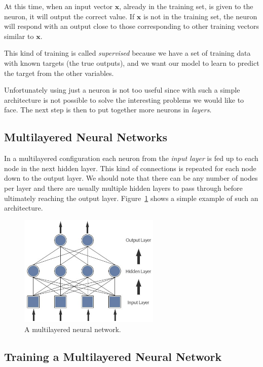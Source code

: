 At this time, when an input vector \(\mathbf{x}\), already in the training
set, is given to the neuron, it will output the correct value. If
\(\mathbf{x}\) is not in the training set, the neuron will respond with
an output close to those corresponding to other training vectors similar to \(\mathbf{x}\).

This kind of training is called \emph{supervised} because we have a set of training data with known targets 
(the true outputs), and we want our model to learn to predict the target from the other variables.

Unfortunately using just a neuron is not too useful since with
such a simple architecture is not possible to solve the interesting problems we would like to face. 
The next step is then to put together more neurons in \emph{layers}.

\subsection{Multilayered Neural Networks}\label{multi-layered-neural-networks}

In a multilayered configuration each neuron from the \emph{input layer} 
is fed up to each node in the
next hidden layer. This kind of connections is repeated for each node down to the output layer. 
We should note that there can be any number of nodes per layer and there
are usually multiple hidden layers to pass through before ultimately
reaching the output layer. Figure~\ref{fig:multilayered_nn} shows a simple
example of such an architecture.

\begin{figure}[htb]
	\centering
	\includegraphics[width=0.6\textwidth]{figures/multilayer.jpeg}
	\caption{A multilayered neural network.}
	\label{fig:multilayered_nn}
\end{figure}

\subsection{Training a Multilayered Neural Network}\label{training-a-multilayered-neural-network}

